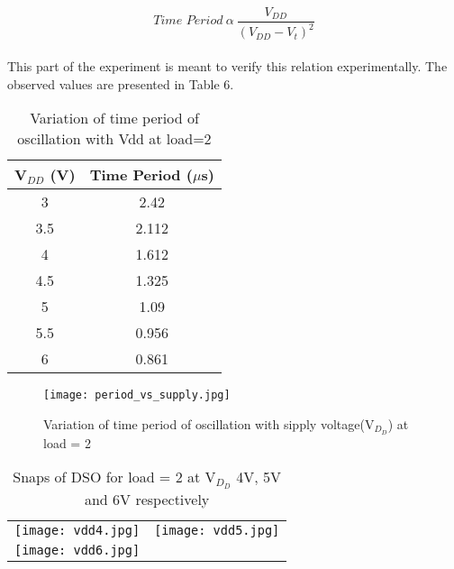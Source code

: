 \documentclass[12pt]{article}
\begin{document}
\begin{equation}
\textit{Time Period} \  \alpha \ \frac{V_{DD}}{(V_{DD}-V_t)^2}
\end{equation}
\\
 This part of the experiment is meant to verify this relation experimentally. The observed values are presented in Table 6.\\
\begin{table}[H]
\centering
\begin{tabular}{| c | c |} 
\hline
\textbf{ V$_{DD}$ (V)} &\textbf{ Time Period ($\mu$s)} \\ 
\hline
3 & 2.42  \\
3.5 & 2.112 \\
4 & 1.612 \\
4.5 & 1.325 \\
5 & 1.09  \\
5.5 & 0.956 \\
6 & 0.861 \\
\hline

\hline
\end{tabular}
\caption{Variation of time period of oscillation with Vdd at load=2}
\end{table}

\begin{figure}[H]
\texttt{[image: period\_vs\_supply.jpg]}
\centering
\caption{Variation of time period of oscillation with sipply voltage(V$_D_D$) at load = 2}
\end{figure}
\begin{table}[H]
\centering  %
\begin{tabular}{|c | c|} %

\texttt{[image: vdd4.jpg]}


& 

\texttt{[image: vdd5.jpg]}
\\
\texttt{[image: vdd6.jpg]}




\\

\end{tabular}
\caption{Snaps of DSO for load = 2 at V$_D_D$ 4V, 5V and 6V respectively }
\label{table:demotable}
\end{table}
\end{document}
